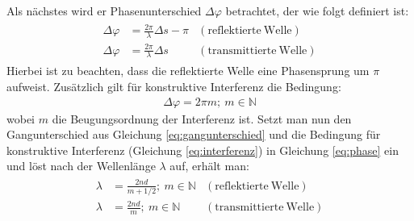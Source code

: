 Als nächstes wird er Phasenunterschied $\Delta \varphi$ betrachtet, der wie folgt definiert ist:
\begin{gather}
	\begin{aligned}
		 \Delta \varphi &= \frac{2\pi}{\lambda}\Delta s - \pi &\mathrm{(reflektierte~Welle)}\\
		 \Delta \varphi &= \frac{2\pi}{\lambda}\Delta s &\mathrm{(transmittierte~Welle)}
	\end{aligned}
	\label{eq:phase}
\end{gather}
Hierbei ist zu beachten, dass die reflektierte Welle eine Phasensprung um $\pi$ aufweist. Zusätzlich gilt für konstruktive Interferenz die Bedingung:
\begin{gather}
	\boxed{\Delta \varphi = 2\pi m;~m \in \mathbb{N}}
	\label{eq:interferenz}
\end{gather}
wobei $m$ die Beugungsordnung der Interferenz ist. Setzt man nun den Gangunterschied aus Gleichung \ref{eq:gangunterschied} und die Bedingung für konstruktive Interferenz (Gleichung \ref{eq:interferenz}) in Gleichung \ref{eq:phase} ein und löst nach der Wellenlänge $\lambda$ auf, erhält man: \cite{DemtroederOptik}
\begin{gather}
	\boxed{
	\begin{aligned}
		 \lambda &= \frac{2nd}{m + 1/2};~m \in \mathbb{N} &\mathrm{(reflektierte~Welle)}\\
		 \lambda &= \frac{2nd}{m};~m \in \mathbb{N} &\mathrm{(transmittierte~Welle)}
	\end{aligned}
	}
	\label{eq:wavelength}
\end{gather}